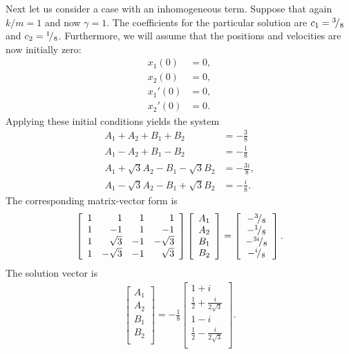 Next let us consider a case with an inhomogeneous term. Suppose that again $k/m = 1$ and now $\gamma = 1$. The coefficients for the particular solution are $c_1 = {}^{3}\!/_{8}$ and $c_2 = {}^{1}\!/_{8}$. Furthermore, we will assume that the positions and velocities are now initially zero:
\begin{align}
  x_1(0)  &= 0, \nonumber \\
  x_2(0)  &= 0, \nonumber \\
  x_1'(0) &= 0, \nonumber \\
  x_2'(0) &= 0. 
\end{align}
Applying these initial conditions yields the system
\begin{subequations}
\begin{align}
  A_1 + A_2 + B_1 + B_2 &= -\frac{3}{8} \\
  A_1 - A_2 + B_1 - B_2 &= -\frac{1}{8} \\
  A_1 + \sqrt{3} A_2 - B_1 - \sqrt{3} B_2 &= -\frac{3i}{8}, \\
  A_1 - \sqrt{3} A_2 - B_1 + \sqrt{3} B_2 &= -\frac{i}{8}.
\end{align}
\end{subequations}
The corresponding matrix-vector form is
\begin{align}
  \left[ \begin{array}{r r r r}
  1 &  1 & 1 &  1 \\
  1 & -1 & 1 & -1 \\
  1 &  \sqrt{3} & -1 & -\sqrt{3} \\
  1 & -\sqrt{3} & -1 &  \sqrt{3} \\ \end{array} \right]
  \left[ \begin{array}{c} A_1 \\ A_2 \\ B_1 \\ B_2 \\ \end{array} \right] =
  \left[ \begin{array}{c} -{}^{3}\!/_{8} \\ -{}^{1}\!/_{8} \\ -{}^{3i}\!/_{8} \\ -{}^{i}\!/_{8} \\ \end{array} \right] .
\end{align}
The solution vector is
\begin{align}
  \left[ \begin{array}{c} A_1 \\ A_2 \\ B_1 \\ B_2 \\ \end{array} \right] =
  -\frac{1}{8} \left[ \begin{array}{c} 1 + i \\ \frac{1}{2} + \frac{i}{2 \sqrt{3}} \\ 1 - i \\ \frac{1}{2} - \frac{i}{2 \sqrt{3}} \\ \end{array} \right] .
\end{align}

